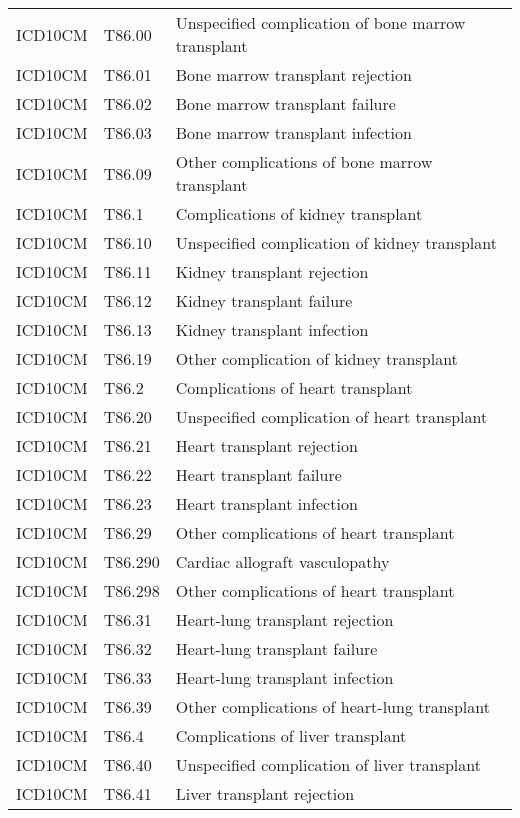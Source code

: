 \begin{table}[ht]
\begin{tabular}{lll}
  ICD10CM & T86.00 & Unspecified complication of bone marrow transplant \\ 
  ICD10CM & T86.01 & Bone marrow transplant rejection \\ 
  ICD10CM & T86.02 & Bone marrow transplant failure \\ 
  ICD10CM & T86.03 & Bone marrow transplant infection \\ 
  ICD10CM & T86.09 & Other complications of bone marrow transplant \\ 
  ICD10CM & T86.1 & Complications of kidney transplant \\ 
  ICD10CM & T86.10 & Unspecified complication of kidney transplant \\ 
  ICD10CM & T86.11 & Kidney transplant rejection \\ 
  ICD10CM & T86.12 & Kidney transplant failure \\ 
  ICD10CM & T86.13 & Kidney transplant infection \\ 
  ICD10CM & T86.19 & Other complication of kidney transplant \\ 
  ICD10CM & T86.2 & Complications of heart transplant \\ 
  ICD10CM & T86.20 & Unspecified complication of heart transplant \\ 
  ICD10CM & T86.21 & Heart transplant rejection \\ 
  ICD10CM & T86.22 & Heart transplant failure \\ 
  ICD10CM & T86.23 & Heart transplant infection \\ 
  ICD10CM & T86.29 & Other complications of heart transplant \\ 
  ICD10CM & T86.290 & Cardiac allograft vasculopathy \\ 
  ICD10CM & T86.298 & Other complications of heart transplant \\ 
  ICD10CM & T86.31 & Heart-lung transplant rejection \\ 
  ICD10CM & T86.32 & Heart-lung transplant failure \\ 
  ICD10CM & T86.33 & Heart-lung transplant infection \\ 
  ICD10CM & T86.39 & Other complications of heart-lung transplant \\ 
  ICD10CM & T86.4 & Complications of liver transplant \\ 
  ICD10CM & T86.40 & Unspecified complication of liver transplant \\ 
  ICD10CM & T86.41 & Liver transplant rejection \\ 

\end{tabular}
\end{table}
